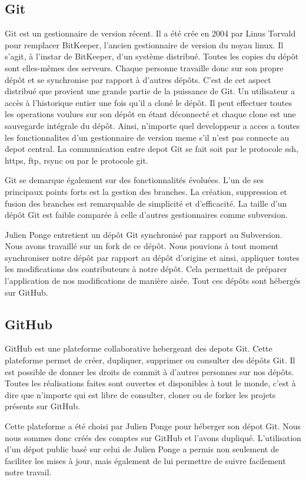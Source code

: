 \subsection{Git}
Git est un gestionnaire de version récent. Il a été crée en 2004 par Linus Torvald pour remplacer BitKeeper, l'ancien gestionnaire de version du noyau linux.
Il s'agit, à l'instar de BitKeeper, d'un système distribué. Toutes les copies du dépôt sont elles-mêmes des serveurs.
Chaque personne travaille donc sur son propre dépôt et se synchronise par rapport à d'autres dépôts. C'est de cet aspect distribué que provient une grande partie de la puissance de Git.
Un utilisateur a accès à l'historique entier une fois qu'il a cloné le dépôt. Il peut effectuer toutes les operations voulues sur son dépôt en étant déconnecté et chaque clone est une sauvegarde intégrale du dépôt.
Ainsi, n'importe quel developpeur a acces a toutes les fonctionnalites d'un gestionnaire de version meme s'il n'est pas connecte au depot central.
La communication entre depot Git se fait soit par le protocole ssh, https, ftp, rsync ou par le protocole git.

Git se demarque également  sur des fonctionnalités évoluées. L'un de ses principaux points forts est la gestion des branches. La création, suppression et fusion des branches est remarquable de simplicité et d'efficacité.
La taille d'un dépôt Git est faible comparée à celle d'autres gestionnaires comme subversion.

Julien Ponge entretient un dépôt Git synchronisé par rapport au Subversion. Nous avons travaillé sur un fork de ce dépôt.
Nous pouvions à tout moment synchroniser notre dépôt par rapport au dépôt d'origine et ainsi, appliquer toutes les modifications des contributeurs à notre dépôt.
Cela permettait de préparer l'application de nos modifications de manière aisée. Tout ces dépôts sont hébergés sur GitHub.
\subsection{GitHub}
GitHub est une plateforme collaborative hebergeant des depots Git. Cette plateforme permet de créer, dupliquer, supprimer ou consulter des dépôts Git.
Il est possible de donner les droits de commit à d'autres personnes sur nos dépôts. Toutes les réalisations faites sont ouvertes et disponibles à tout le monde, c'est à dire que n'importe qui est libre de consulter, cloner ou de forker les projets présents sur GitHub.

Cette plateforme a été choisi par Julien Ponge pour héberger son dépot Git. Nous nous sommes donc créés des comptes sur GitHub et l'avons dupliqué. L'utilisation d'un dépot public basé sur celui de Julien Ponge a permis non seulement de faciliter les mises à jour, mais également de lui permettre de suivre facilement notre travail.


